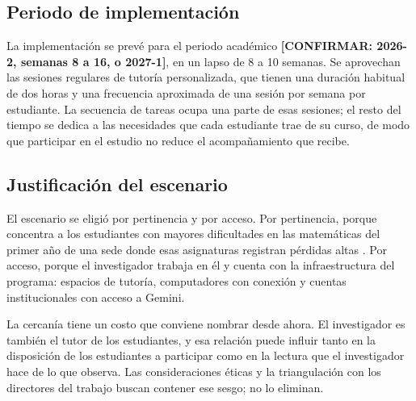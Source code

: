 \subsection{Periodo de implementación}

La implementación se prevé para el periodo académico \textbf{[CONFIRMAR: 2026-2, semanas 8 a 16, o 2027-1]}, en un lapso de 8 a 10 semanas. Se aprovechan las sesiones regulares de tutoría personalizada, que tienen una duración habitual de dos horas y una frecuencia aproximada de una sesión por semana por estudiante. La secuencia de tareas ocupa una parte de esas sesiones; el resto del tiempo se dedica a las necesidades que cada estudiante trae de su curso, de modo que participar en el estudio no reduce el acompañamiento que recibe.

\subsection{Justificación del escenario}

El escenario se eligió por pertinencia y por acceso. Por pertinencia, porque concentra a los estudiantes con mayores dificultades en las matemáticas del primer año de una sede donde esas asignaturas registran pérdidas altas \parencite{unal2021gea}. Por acceso, porque el investigador trabaja en él y cuenta con la infraestructura del programa: espacios de tutoría, computadores con conexión y cuentas institucionales con acceso a Gemini.

La cercanía tiene un costo que conviene nombrar desde ahora. El investigador es también el tutor de los estudiantes, y esa relación puede influir tanto en la disposición de los estudiantes a participar como en la lectura que el investigador hace de lo que observa. Las consideraciones éticas y la triangulación con los directores del trabajo buscan contener ese sesgo; no lo eliminan.

